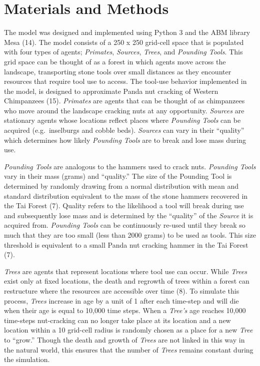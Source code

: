 \documentclass[9pt,twocolumn,twoside,]{pnas-new}
\begin{document}
\hypertarget{materials-and-methods}{%
\section{Materials and Methods}\label{materials-and-methods}}

The model was designed and implemented using Python 3 and the ABM
library Mesa (14). The model consists of a 250 x 250 grid-cell space
that is populated with four types of agents; \emph{Primates},
\emph{Sources}, \emph{Trees}, and \emph{Pounding Tools}. This grid space
can be thought of as a forest in which agents move across the landscape,
transporting stone tools over small distances as they encounter
resources that require tool use to access. The tool-use behavior
implemented in the model, is designed to approximate Panda nut cracking
of Western Chimpanzees (15). \emph{Primates} are agents that can be
thought of as chimpanzees who move around the landscape cracking nuts at
any opportunity. \emph{Sources} are stationary agents whose locations
reflect places where \emph{Pounding Tools} can be acquired
(e.g.~inselburgs and cobble beds). \emph{Sources} can vary in their
``quality'' which determines how likely \emph{Pounding Tools} are to
break and lose mass during use.

\emph{Pounding Tools} are analogous to the hammers used to crack nuts.
\emph{Pounding Tools} vary in their mass (grams) and ``quality.'' The
size of the Pounding Tool is determined by randomly drawing from a
normal distribution with mean and standard distribution equivalent to
the mass of the stone hammers recovered in the Tai Forest (7). Quality
refers to the likelihood a tool will break during use and subsequently
lose mass and is determined by the ``quality'' of the \emph{Source} it
is acquired from. \emph{Pounding Tools} can be continuously re-used
until they break so much that they are too small (less than 2000 grams)
to be used as tools. This size threshold is equivalent to a small Panda
nut cracking hammer in the Tai Forest (7).

\emph{Trees} are agents that represent locations where tool use can
occur. While \emph{Trees} exist only at fixed locations, the death and
regrowth of trees within a forest can restructure where the resources
are accessible over time (8). To simulate this process, \emph{Trees}
increase in age by a unit of 1 after each time-step and will die when
their age is equal to 10,000 time steps. When a \emph{Tree's} age
reaches 10,000 time-steps nut-cracking can no longer take place at its
location and a new location within a 10 grid-cell radius is randomly
chosen as a place for a new \emph{Tree} to ``grow.'' Though the death
and growth of \emph{Trees} are not linked in this way in the natural
world, this ensures that the number of \emph{Trees} remains constant
during the simulation.
\end{document}
